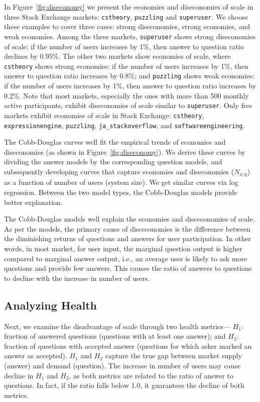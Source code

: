 In Figure~\ref{fig:diseconomy} we present the economies and diseconomies of scale in three Stack Exchange markets: \texttt{cstheory}, \texttt{puzzling} and \texttt{superuser}. We choose these examples to cover three cases: strong diseconomies, strong economies, and weak economies. Among the three markets, \texttt{superuser} shows strong diseconomies of scale: if the number of users increases by 1\%, then answer to question ratio declines by 0.95\%. The other two markets show economies of scale, where \texttt{cstheory} shows strong economies: if the number of users increases by 1\%, then answer to question ratio increases by 0.8\%; and \texttt{puzzling} shows weak economies: if the number of users increases by 1\%, then answer to question ratio increases by 0.2\%. Note that most markets, especially the ones with more than 500 monthly active participants, exhibit diseconomies of scale similar to \texttt{superuser}. Only five markets exhibit economies of scale in Stack Exchange: \texttt{cstheory}, \texttt{expressionengine}, \texttt{puzzling}, \texttt{ja\_stackoverflow}, and \texttt{softwareengineering}.

The Cobb-Douglas curves well fit the empirical trends of economies and diseconomies (as shown in Figure~\ref{fig:diseconomy}). We derive these curves by dividing the answer models by the corresponding question models, and subsequently developing curves that capture economies and diseconomies ($N_{a/q}$) as a function of number of users (system size). We get similar curves via log regression. Between the two model types, the Cobb-Douglas models provide better explanation.

The Cobb-Douglas models well explain the economies and disceconomies of scale. As per the models, the primary cause of disceconomies is the difference between the diminishing returns of questions and answers for user participation. In other words, in most market, for user input, the marginal question output is higher compared to marginal answer output, i.e., an average user is likely to ask more questions and provide few answers. This causes the ratio of answers to questions to decline with the increase in number of users. 

\subsection{Analyzing Health}
Next, we examine the disadvantage of scale through two health metrics--- $H_1:$ fraction of answered questions (questions with at least one answer); and $H_2:$ fraction of questions with accepted answer (questions for which asker marked an answer as accepted). $H_1$ and $H_2$ capture the true gap between market supply (answer) and demand (question). The increase in number of users may cause decline in $H_1$ and $H_2$, as both metrics are related to the ratio of answer to questions. In fact, if the ratio falls below 1.0, it guarantees the decline of both metrics. 

